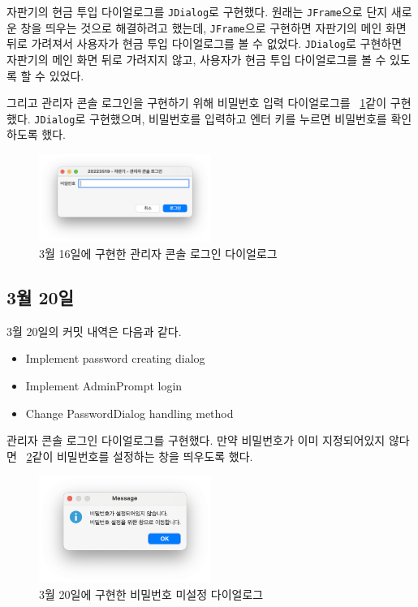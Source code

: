 \documentclass{oblivoir}
\newcommand{\figref}[1]{\figurename~\ref{#1}}
\begin{document}
    자판기의 현금 투입 다이얼로그를 \texttt{JDialog}로 구현했다.
    원래는 \texttt{JFrame}으로 단지 새로운 창을 띄우는 것으로 해결하려고 했는데,
    \texttt{JFrame}으로 구현하면 자판기의 메인 화면 뒤로 가려져서 사용자가 현금 투입 다이얼로그를 볼 수 없었다.
    \texttt{JDialog}로 구현하면 자판기의 메인 화면 뒤로 가려지지 않고, 사용자가 현금 투입 다이얼로그를 볼 수 있도록 할 수 있었다.

    그리고 관리자 콘솔 로그인을 구현하기 위해 비밀번호 입력 다이얼로그를 \figref{fig:0316-password-dialog}\와 같이 구현했다.
    \texttt{JDialog}로 구현했으며, 비밀번호를 입력하고 엔터 키를 누르면 비밀번호를 확인하도록 했다.
    \begin{figure}[h]
        \centering
        \includegraphics[width=0.5\textwidth]{images/dev-snapshop/0316-password-dialog}
        \caption{3월 16일에 구현한 관리자 콘솔 로그인 다이얼로그}
        \label{fig:0316-password-dialog}
    \end{figure}

    \subsection{3월 20일}

    3월 20일의 커밋 내역은 다음과 같다.
    \begin{itemize}
        \item Implement password creating dialog
        \item Implement AdminPrompt login
        \item Change PasswordDialog handling method
    \end{itemize}

    관리자 콘솔 로그인 다이얼로그를 구현했다.
    만약 비밀번호가 이미 지정되어있지 않다면 \figref{fig:0320-password-not-set}\와 같이
    비밀번호를 설정하는 창을 띄우도록 했다.
    \begin{figure}[h]
        \centering
        \includegraphics[width=0.5\textwidth]{images/dev-snapshop/0320-password-not-set}
        \caption{3월 20일에 구현한 비밀번호 미설정 다이얼로그}
        \label{fig:0320-password-not-set}
    \end{figure}
\end{document}

